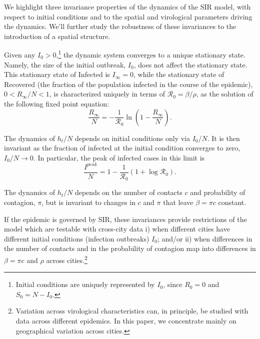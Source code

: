 \documentclass[english,11pt]{article}
\begin{document}
We highlight three invariance properties of the dynamics of the SIR model, with respect to initial conditions %
and to the spatial and virological parameters driving the dynamics. %
We'll further study the robustness of these invariances to the introduction of a spatial structure. 
\newline

Given any $I_0>0$,\footnote{Initial conditions are uniquely represented by $I_0$, since $R_0=0$ and $S_0=N-I_0$.} the dynamic system converges to a  unique stationary state. Namely, the size of the initial outbreak, $I_0$,  does not affect the stationary state.  
This stationary state of Infected is $I_{\infty}=0$, while the stationary state of Recovered (the fraction of the population infected in the course of the epidemic), $0<{R_{\infty}}/{N}<1$,  is characterized uniquely in terms of $\mathcal{R}_{0}=\beta/\rho$, as the solution of the following fixed point
equation:
\begin{equation}
\frac{R_{\infty}}{N}=-\frac{1}{\mathcal{R}_{0}}\ln(1-\frac{R_{\infty}}{N}).\label{ss}
\end{equation}

 The   dynamics of ${h_t}/{N}$ depends on initial conditions only via  ${I_0}/{N}$. It is then  invariant as the fraction of infected at the initial condition converges to zero, ${I_0}/{N}  \rightarrow 0$. In particular, the peak of infected cases in this limit is 
\begin{equation} 
    \frac{I^{peak}}{N}=1-\frac{1}{\mathcal{R}_0} \left(1+\log \mathcal{R}_0 \right). 
    \label{peak} 
\end{equation}

The  dynamics of ${h_t}/{N}$ depends on the number of contacts  $c$  and probability of contagion, $\pi$, but is invariant to changes in  $c$  and $\pi$  that leave $\beta=\pi c$ constant. \newline 

\label{transdyn}If the epidemic is governed by SIR, these invariances provide restrictions of the model which are testable with cross-city data i) when different cities have different initial conditions (infection outbreaks) $I_0$; and/or ii) when differences in the number of contacts and in the probability of contagion map into differences in  $\beta=\pi c$ and $\rho$ across cities.\footnote{Variation across virological characteristics can, in principle, be studied with data across different epidemics. In this paper, we concentrate mainly on geographical variation across cities.} %
\end{document}
